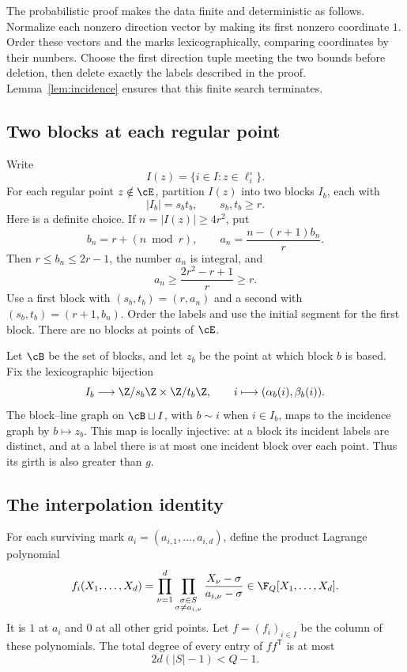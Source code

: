 The probabilistic proof makes the data finite and deterministic as
follows. Normalize each nonzero direction vector by making its first
nonzero coordinate \(1\). Order these vectors and the marks
lexicographically, comparing coordinates by their numbers. Choose the first direction
tuple meeting the two bounds before deletion, then delete exactly the
labels described in the proof. Lemma~\ref{lem:incidence} ensures that
this finite search terminates.

\subsection{Two blocks at each regular point}

Write
\[
 I(z)=\{i\in I:z\in\ell_i^\circ\}.
\]
For each regular point \(z\notin\cE\), partition \(I(z)\) into two
blocks \(I_b\), each with
\begin{equation}\label{eq:block-shape}
 |I_b|=s_bt_b,\qquad s_b,t_b\ge r.
\end{equation}
Here is a definite choice. If \(n=|I(z)|\ge4r^2\), put
\[
 b_n=r+(n\bmod r),\qquad
 a_n=\frac{n-(r+1)b_n}{r}.
\]
Then \(r\le b_n\le2r-1\), the number \(a_n\) is integral, and
\[
 a_n\ge\frac{2r^2-r+1}{r}\ge r.
\]
Use a first block with \((s_b,t_b)=(r,a_n)\) and a second with
\((s_b,t_b)=(r+1,b_n)\).
Order the labels and use the initial segment for the first block.
There are no blocks at points of \(\cE\).

Let \(\cB\) be the set of blocks, and let \(z_b\) be the point at
which block \(b\) is based. Fix the lexicographic bijection
\begin{equation}\label{eq:coordinates}
 I_b\longrightarrow\Z/s_b\Z\times\Z/t_b\Z,\qquad
 i\longmapsto(\alpha_b(i),\beta_b(i)).
\end{equation}
The block--line graph on \(\cB\sqcup I\), with \(b\sim i\) when
\(i\in I_b\), maps to the incidence graph by \(b\mapsto z_b\).
This map is locally injective: at a block its incident labels are
distinct, and at a label there is at most one incident block over each
point. Thus its girth is also greater than \(g\).

\subsection{The interpolation identity}

For each surviving mark \(a_i=(a_{i,1},\ldots,a_{i,d})\), define the
product Lagrange polynomial
\[
 f_i(X_1,\ldots,X_d)=
 \prod_{\nu=1}^{d}
 \prod_{\substack{\sigma\in S\\\sigma\ne a_{i,\nu}}}
 \frac{X_\nu-\sigma}{a_{i,\nu}-\sigma}\in\F_Q[X_1,\ldots,X_d].
\]
It is \(1\) at \(a_i\) and \(0\) at all other grid points.
Let \(f=(f_i)_{i\in I}\) be the column of these polynomials.
The total degree of every entry of \(ff^{\mathsf T}\) is at most
\[
 2d(|S|-1)<Q-1.
\]

